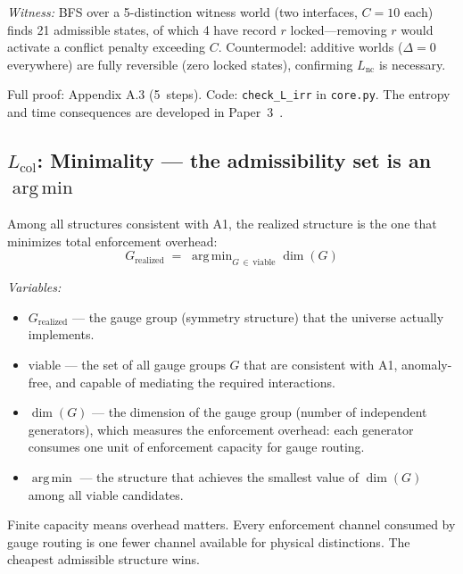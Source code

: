 \documentclass[11pt]{article}
\DeclareMathOperator*{\argmin}{arg\,min}
\begin{document}
\textit{Witness:} BFS over a 5-distinction witness world (two interfaces, $C=10$ each) finds 21 admissible states, of which 4 have record $r$ locked---removing $r$ would activate a conflict penalty exceeding $C$.  Countermodel: additive worlds ($\Delta = 0$ everywhere) are fully reversible (zero locked states), confirming $L_{\mathrm{nc}}$ is necessary.

Full proof: Appendix A.3 (5~steps).  Code: \texttt{check\_L\_irr} in \texttt{core.py}.  The entropy and time consequences are developed in Paper~3~\cite{P3}.


\subsection{\texorpdfstring{$L_{\mathrm{col}}$}{Lcol}: Minimality --- the admissibility set is an \texorpdfstring{$\argmin$}{argmin}}

\begin{tcolorbox}[apfbox, title={Lemma $L_{\mathrm{col}}$ (Minimality / Capacity Optimization)}]
Among all structures consistent with A1, the realized structure is the one that minimizes total enforcement overhead:
\begin{equation}
G_{\mathrm{realized}} \;=\; \argmin_{G \,\in\, \mathrm{viable}} \dim(G)
\end{equation}

\smallskip\noindent\textit{Variables:}
\begin{itemize}[nosep,leftmargin=2em]
\item $G_{\mathrm{realized}}$ --- the gauge group (symmetry structure) that the universe actually implements.
\item $\mathrm{viable}$ --- the set of all gauge groups $G$ that are consistent with A1, anomaly-free, and capable of mediating the required interactions.
\item $\dim(G)$ --- the dimension of the gauge group (number of independent generators), which measures the enforcement overhead: each generator consumes one unit of enforcement capacity for gauge routing.
\item $\argmin$ --- the structure that achieves the smallest value of $\dim(G)$ among all viable candidates.
\end{itemize}

\smallskip\noindent
Finite capacity means overhead matters.  Every enforcement channel consumed by gauge routing is one fewer channel available for physical distinctions.  The cheapest admissible structure wins.
\end{tcolorbox}
\end{document}
